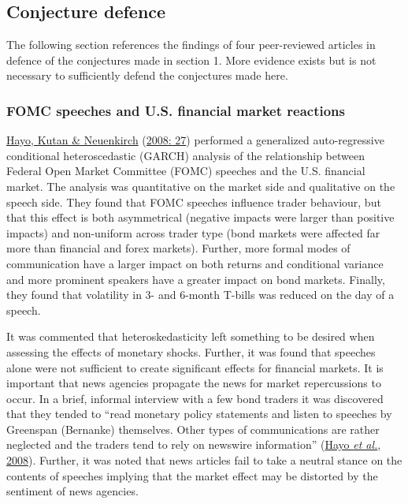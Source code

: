 \documentclass[11pt,preprint, authoryear]{elsarticle}
\numberwithin{equation}{section}
\numberwithin{figure}{section}
\numberwithin{table}{section}
\begin{document}
\hypertarget{conjecture-defence}{%
\subsection{\texorpdfstring{Conjecture defence
\label{Conjecture defence}}{Conjecture defence }}\label{conjecture-defence}}

The following section references the findings of four peer-reviewed
articles in defence of the conjectures made in section 1. More evidence
exists but is not necessary to sufficiently defend the conjectures made
here.

\hypertarget{fomc-speeches-and-u.s.-financial-market-reactions}{%
\subsubsection{\texorpdfstring{FOMC speeches and U.S. financial market
reactions
\label{FOMC speeches}}{FOMC speeches and U.S. financial market reactions }}\label{fomc-speeches-and-u.s.-financial-market-reactions}}

\protect\hyperlink{ref-hayo2008communicating}{Hayo, Kutan \& Neuenkirch}
(\protect\hyperlink{ref-hayo2008communicating}{2008: 27}) performed a
generalized auto-regressive conditional heteroscedastic (GARCH) analysis
of the relationship between Federal Open Market Committee (FOMC)
speeches and the U.S. financial market. The analysis was quantitative on
the market side and qualitative on the speech side. They found that FOMC
speeches influence trader behaviour, but that this effect is both
asymmetrical (negative impacts were larger than positive impacts) and
non-uniform across trader type (bond markets were affected far more than
financial and forex markets). Further, more formal modes of
communication have a larger impact on both returns and conditional
variance and more prominent speakers have a greater impact on bond
markets. Finally, they found that volatility in 3- and 6-month T-bills
was reduced on the day of a speech.

It was commented that heteroskedasticity left something to be desired
when assessing the effects of monetary shocks. Further, it was found
that speeches alone were not sufficient to create significant effects
for financial markets. It is important that news agencies propagate the
news for market repercussions to occur. In a brief, informal interview
with a few bond traders it was discovered that they tended to ``read
monetary policy statements and listen to speeches by Greenspan
(Bernanke) themselves. Other types of communications are rather
neglected and the traders tend to rely on newswire information''
(\protect\hyperlink{ref-hayo2008communicating}{Hayo \emph{et al.},
2008}). Further, it was noted that news articles fail to take a neutral
stance on the contents of speeches implying that the market effect may
be distorted by the sentiment of news agencies.
\end{document}
